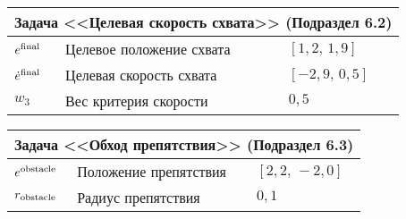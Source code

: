 \documentclass[../../doc.tex]{subfiles}
\begin{document}
    \begin{flushleft}\begin{tabular}{|p{2cm}|p{9.7cm}|p{4cm}|}
        \hline
        \multicolumn{3}{|c|}{Задача <<Целевая скорость схвата>> (Подраздел 6.2)}
        \\ \hline\hline
        $e^{\textnormal{final}}$ & Целевое положение схвата & $[1,\!2,\,1,\!9]$
        \\ \hline
        $\dot e^{\textnormal{final}}$ & Целевая скорость схвата & $[-2,\!9,\,0,\!5]$
        \\ \hline
        $w_3$ & Вес критерия скорости & $0,\!5$
        \\ \hline
    \end{tabular}\end{flushleft}

    \begin{flushleft}\begin{tabular}{|p{2cm}|p{9.7cm}|p{4cm}|}
        \hline
        \multicolumn{3}{|c|}{Задача <<Обход препятствия>> (Подраздел 6.3)}
        \\ \hline\hline
        $e^{\textnormal{obstacle}}$ & Положение препятствия & $[2,\!2,\,-2,\!0]$
        \\ \hline
        $r_{\textnormal{obstacle}}$ & Радиус препятствия & $0,\!1$
        \\ \hline
    \end{tabular}\end{flushleft}

    \clearpage
\end{document}
